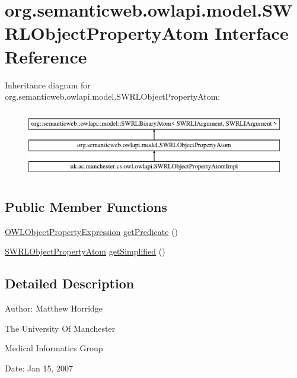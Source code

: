 \hypertarget{interfaceorg_1_1semanticweb_1_1owlapi_1_1model_1_1_s_w_r_l_object_property_atom}{\section{org.\-semanticweb.\-owlapi.\-model.\-S\-W\-R\-L\-Object\-Property\-Atom Interface Reference}
\label{interfaceorg_1_1semanticweb_1_1owlapi_1_1model_1_1_s_w_r_l_object_property_atom}
}
Inheritance diagram for org.\-semanticweb.\-owlapi.\-model.\-S\-W\-R\-L\-Object\-Property\-Atom\-:\begin{figure}[H]
\begin{center}
\leavevmode
\includegraphics[height=3.000000cm]{interfaceorg_1_1semanticweb_1_1owlapi_1_1model_1_1_s_w_r_l_object_property_atom}
\end{center}
\end{figure}
\subsection*{Public Member Functions}
\begin{DoxyCompactItemize}
\item 
\hyperlink{interfaceorg_1_1semanticweb_1_1owlapi_1_1model_1_1_o_w_l_object_property_expression}{O\-W\-L\-Object\-Property\-Expression} \hyperlink{interfaceorg_1_1semanticweb_1_1owlapi_1_1model_1_1_s_w_r_l_object_property_atom_a87c64f1df5b4d5bb9222da7a7102c867}{get\-Predicate} ()
\item 
\hyperlink{interfaceorg_1_1semanticweb_1_1owlapi_1_1model_1_1_s_w_r_l_object_property_atom}{S\-W\-R\-L\-Object\-Property\-Atom} \hyperlink{interfaceorg_1_1semanticweb_1_1owlapi_1_1model_1_1_s_w_r_l_object_property_atom_a85a31b715615cb5c0cee2231d6aafa7a}{get\-Simplified} ()
\end{DoxyCompactItemize}


\subsection{Detailed Description}
Author\-: Matthew Horridge\par
 The University Of Manchester\par
 Medical Informatics Group\par
 Date\-: Jan 15, 2007\par
\par
 

